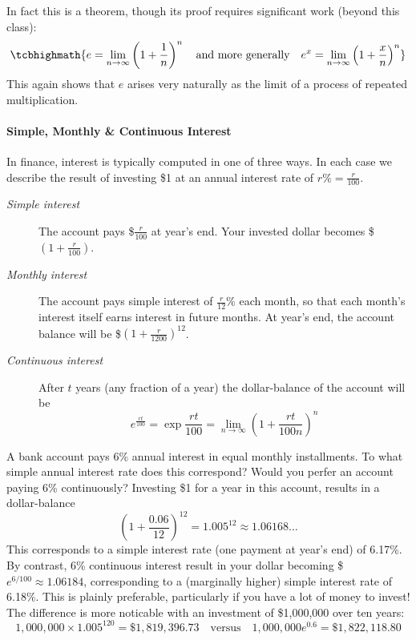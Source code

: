 In fact this is a theorem, though its proof requires significant work (beyond this class):
\[
	\tcbhighmath{
		e =\lim_{n\to\infty}\left(1+\frac 1n\right)^n
		\quad\text{and more generally}\quad 
		e^x =\lim_{n\to\infty}\left(1+\frac xn\right)^n
	}
\]
This again shows that $e$ arises very naturally as the limit of a process of repeated multiplication.


\paragraph{Simple, Monthly \& Continuous Interest}

In finance, interest is typically computed in one of three ways. In each case we describe the result of investing \$1 at an annual interest rate of $r\%=\frac r{100}$.
\begin{description}
	\item[\normalfont\emph{Simple interest}] The account pays \$$\frac r{100}$ at year's end. Your invested dollar becomes \$$\left(1+\frac r{100}\right)$.
	\item[\normalfont\emph{Monthly interest}] The account pays simple interest of $\frac r{12}$\% each month, so that each month's interest itself earns interest in future months. At year's end, the account balance\footnotemark{} will be \$$(1+\frac r{1200})^{12}$.
	\item[\normalfont\emph{Continuous interest}] After $t$ years (any fraction of a year) the dollar-balance of the account will be
	\[
		e^{\frac{rt}{100}}=\exp\frac{rt}{100} =\lim_{n\to\infty}\left(1+\frac{rt}{100n}\right)^n
	\]
\end{description}




\begin{example}{}{}
	A bank account pays 6\% annual interest in equal monthly installments. To what simple annual interest rate does this correspond? Would you perfer an account paying 6\% continuously?\smallbreak
	Investing \$1 for a year in this account, results in a dollar-balance
	\[
	 	\left(1+\frac{0.06}{12}\right)^{12}=1.005^{12}\approx 1.06168\ldots
	\]
	This corresponds to a simple interest rate (one payment at year's end) of 6.17\%.\smallbreak
	By contrast, 6\% continuous interest result in your dollar becoming \$$e^{6/100}\approx 1.06184$, corresponding to a (marginally higher) simple interest rate of 6.18\%. This is plainly preferable, particularly if you have a lot of money to invest! The difference is more noticable with an investment of \$1,000,000 over ten years:
	\[
		1,\!000,\!000\times 1.005^{120}=\$1,\!819,\!396.73
		\quad\text{versus}\quad
		1,\!000,\!000e^{0.6}=\$1,\!822,\!118.80
	\]
\end{example}



